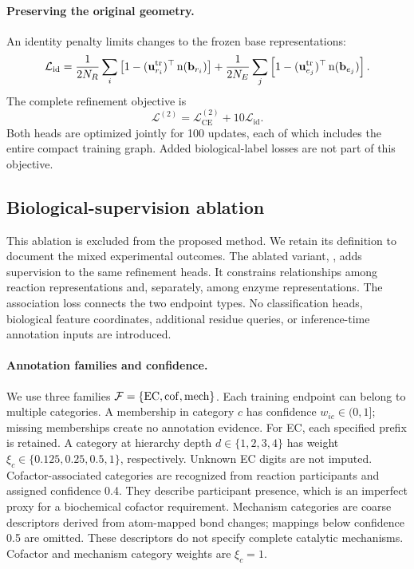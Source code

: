 \paragraph{Preserving the original geometry.}
An identity penalty limits changes to the frozen base representations:
\begin{equation}
  \mathcal L_{\mathrm{id}}=
  \frac{1}{2N_R}\sum_i\left[1-(\mathbf{u}_{r_i}^{\mathrm{tr}})^\top\operatorname{n}(\mathbf{b}_{r_i})\right]
  +\frac{1}{2N_E}\sum_j\left[1-(\mathbf{u}_{e_j}^{\mathrm{tr}})^\top\operatorname{n}(\mathbf{b}_{e_j})\right].
  \label{eq:v4-identity}
\end{equation}
The complete refinement objective is
\begin{equation}
  \boxed{\mathcal L^{(2)}=
     \mathcal L_{\mathrm{CE}}^{(2)}+10\mathcal L_{\mathrm{id}}.}
  \label{eq:v4-phase2-total}
\end{equation}
Both heads are optimized jointly for 100 updates, each of which includes
the entire compact training graph. Added biological-label losses are not
part of this objective.

\subsection{Biological-supervision ablation}
\label{sec:v4-biology}
This ablation is excluded from the proposed method. We retain its
definition to document the mixed experimental outcomes. The ablated
variant, \vfourBio, adds supervision to the same refinement heads.
It constrains relationships among reaction representations and, separately,
among enzyme representations. The association loss connects the two endpoint
types. No classification heads, biological feature coordinates, additional
residue queries, or inference-time annotation inputs are introduced.

\paragraph{Annotation families and confidence.}
We use three families $\mathcal F=\{\mathrm{EC},\mathrm{cof},\mathrm{mech}\}$. Each training endpoint can
belong to multiple categories. A membership in category $c$ has confidence
$w_{ic}\in(0,1]$; missing memberships create no annotation evidence.
For EC, each specified prefix is retained. A category at hierarchy depth
$d\in\{1,2,3,4\}$ has weight
$\xi_c\in\{0.125,0.25,0.5,1\}$, respectively. Unknown EC digits are not
imputed. Cofactor-associated categories are recognized from reaction
participants and assigned confidence 0.4. They describe participant presence,
which is an imperfect proxy for a biochemical cofactor requirement.
Mechanism categories are coarse descriptors derived from atom-mapped bond
changes; mappings below confidence 0.5 are omitted. These descriptors do not
specify complete catalytic mechanisms. Cofactor and mechanism category
weights are $\xi_c=1$.

